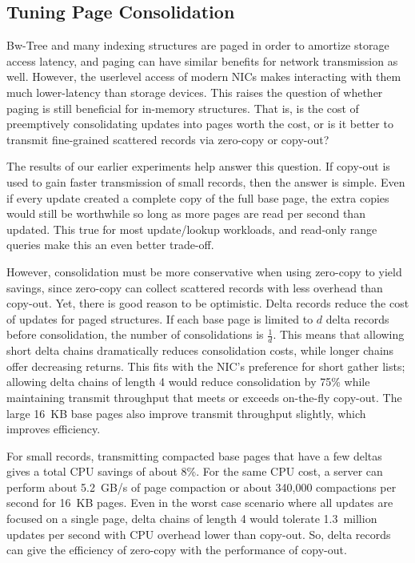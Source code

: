 
\subsection{Tuning Page Consolidation}
\label{sec:consolidation}


Bw-Tree and many indexing structures are paged in order to amortize storage
access latency, and paging can have similar benefits for network transmission
as well. However, the userlevel access of modern NICs makes interacting with
them much lower-latency than storage devices. This raises the question of
whether paging is still beneficial for in-memory structures. That is, is the
cost of preemptively consolidating updates into pages worth the cost, or is it
better to transmit fine-grained scattered records via zero-copy or copy-out?

%




The results of our earlier experiments help answer this question.  If copy-out
is used to gain faster transmission of small records, then the answer is
simple. Even if every update created a complete copy of the full base page, the
extra copies would still be worthwhile so long as more pages are read per
second than updated. This true for most update/lookup workloads, and read-only
range queries make this an even better trade-off.

However, consolidation must be more conservative when using zero-copy to yield
savings, since zero-copy can collect scattered records with less overhead than
copy-out. Yet, there is good reason to be optimistic.  Delta records
reduce the cost of updates for paged structures. If each base page is limited
to $d$ delta records before consolidation, the number of consolidations is
$\frac{1}{d}$. This means that allowing short delta chains dramatically reduces
consolidation costs, while longer chains offer decreasing returns. This fits with
the NIC's preference for short gather lists; allowing delta chains of length 4
would reduce consolidation by 75\% while maintaining transmit throughput that
meets or exceeds on-the-fly copy-out.  The large 16~KB base pages also
improve transmit throughput slightly, which improves efficiency.

For small records, transmitting compacted base pages that have a few deltas gives
a total CPU savings of about 8\%. For the same CPU cost, a server can perform
about 5.2~GB/s of page compaction or about 340,000 compactions per second for
16~KB pages. Even in the worst case scenario where all updates are focused on a
single page, delta chains of length 4 would tolerate 1.3~million updates per
second with CPU overhead lower than copy-out. So, delta records can give the
efficiency of zero-copy with the performance of copy-out.


